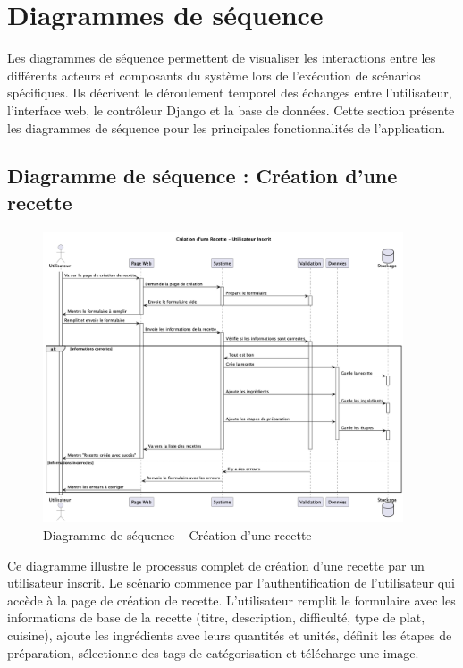 \documentclass[12pt,a4paper]{report}
\begin{document}
\section{Diagrammes de séquence}

Les diagrammes de séquence permettent de visualiser les interactions entre les différents acteurs et composants du système lors de l'exécution de scénarios spécifiques. Ils décrivent le déroulement temporel des échanges entre l'utilisateur, l'interface web, le contrôleur Django et la base de données. Cette section présente les diagrammes de séquence pour les principales fonctionnalités de l'application.

\subsection{Diagramme de séquence : Création d'une recette}

\begin{figure}[H]
    \centering
    \includegraphics[width=0.95\textwidth]{sequence_diagram_creation_recette.png}
    \caption{Diagramme de séquence – Création d'une recette}
    \label{fig:sequence_creation_recette}
\end{figure}

Ce diagramme illustre le processus complet de création d'une recette par un utilisateur inscrit. Le scénario commence par l'authentification de l'utilisateur qui accède à la page de création de recette. L'utilisateur remplit le formulaire avec les informations de base de la recette (titre, description, difficulté, type de plat, cuisine), ajoute les ingrédients avec leurs quantités et unités, définit les étapes de préparation, sélectionne des tags de catégorisation et télécharge une image. 
\end{document}

